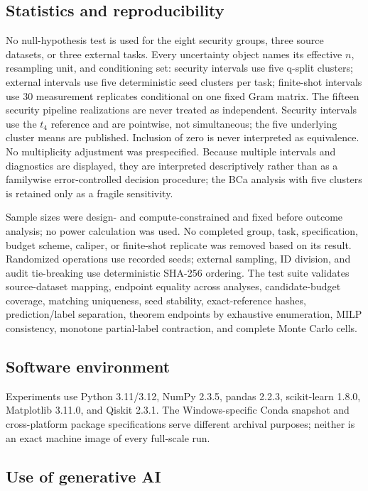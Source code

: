 \documentclass[referee,lineno,pdflatex,sn-nature]{sn-jnl}
\theoremstyle{thmstyleone}%
\theoremstyle{thmstyletwo}%
\theoremstyle{thmstylethree}%
\begin{document}
\subsection{Statistics and reproducibility}

No null-hypothesis test is used for the eight security groups, three source datasets, or three external tasks. Every uncertainty object names its effective $n$, resampling unit, and conditioning set: security intervals use five q-split clusters; external intervals use five deterministic seed clusters per task; finite-shot intervals use 30 measurement replicates conditional on one fixed Gram matrix. The fifteen security pipeline realizations are never treated as independent. Security intervals use the $t_4$ reference and are pointwise, not simultaneous; the five underlying cluster means are published. Inclusion of zero is never interpreted as equivalence. No multiplicity adjustment was prespecified. Because multiple intervals and diagnostics are displayed, they are interpreted descriptively rather than as a familywise error-controlled decision procedure; the BCa analysis with five clusters is retained only as a fragile sensitivity.

Sample sizes were design- and compute-constrained and fixed before outcome analysis; no power calculation was used. No completed group, task, specification, budget scheme, caliper, or finite-shot replicate was removed based on its result. Randomized operations use recorded seeds; external sampling, ID division, and audit tie-breaking use deterministic SHA-256 ordering. The test suite validates source-dataset mapping, endpoint equality across analyses, candidate-budget coverage, matching uniqueness, seed stability, exact-reference hashes, prediction/label separation, theorem endpoints by exhaustive enumeration, MILP consistency, monotone partial-label contraction, and complete Monte Carlo cells.

\subsection{Software environment}

Experiments use Python 3.11/3.12, NumPy 2.3.5, pandas 2.2.3, scikit-learn 1.8.0, Matplotlib 3.11.0, and Qiskit 2.3.1. The Windows-specific Conda snapshot and cross-platform package specifications serve different archival purposes; neither is an exact machine image of every full-scale run.

\subsection{Use of generative AI}
\end{document}
